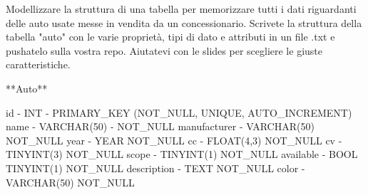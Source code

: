Modellizzare la struttura di una tabella per memorizzare tutti i dati
riguardanti delle auto usate messe in vendita da un concessionario.
Scrivete la struttura della tabella "auto" con le varie proprietà, 
tipi di dato e attributi in un file .txt e pushatelo sulla vostra repo. Aiutatevi con le slides per scegliere le giuste caratteristiche.


**Auto**

id - INT - PRIMARY_KEY (NOT_NULL, UNIQUE, AUTO_INCREMENT)
name - VARCHAR(50) - NOT_NULL
manufacturer - VARCHAR(50) NOT_NULL
year - YEAR NOT_NULL
cc - FLOAT(4,3) NOT_NULL
cv - TINYINT(3) NOT_NULL
scope - TINYINT(1) NOT_NULL
available - BOOL TINYINT(1) NOT_NULL
description - TEXT NOT_NULL
color - VARCHAR(50) NOT_NULL